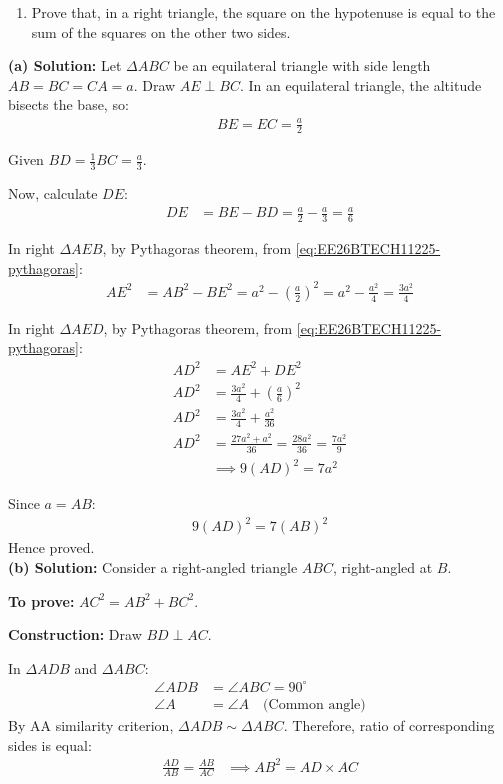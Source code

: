 \begin{enumerate}[label=\thesubsection.\arabic*, ref=\thesubsection.\theenumi]
\begin{enumerate}[label=(\alph*), leftmargin=1.5em, labelsep=0.5em]
        \item Prove that, in a right triangle, the square on the hypotenuse is equal to the sum of the squares on the other two sides.
    \end{enumerate}	\vspace{2pt}
    \noindent\textbf{(a) Solution:} Let $\Delta ABC$ be an equilateral triangle with side length $AB = BC = CA = a$.
Draw $AE \perp BC$. In an equilateral triangle, the altitude bisects the base, so:
\begin{align}
    BE = EC = \frac{a}{2}
\end{align}

Given $BD = \frac{1}{3}BC = \frac{a}{3}$.

Now, calculate $DE$:
\begin{align}
    DE &= BE - BD = \frac{a}{2} - \frac{a}{3} = \frac{a}{6}
\end{align}

In right $\Delta AEB$, by Pythagoras theorem, from \eqref{eq:EE26BTECH11225-pythagoras}:
\begin{align}
    AE^2 &= AB^2 - BE^2 = a^2 - \left(\frac{a}{2}\right)^2 = a^2 - \frac{a^2}{4} = \frac{3a^2}{4}
\end{align}

In right $\Delta AED$, by Pythagoras theorem, from \eqref{eq:EE26BTECH11225-pythagoras}:
\begin{align}
    AD^2 &= AE^2 + DE^2 \\
    AD^2 &= \frac{3a^2}{4} + \left(\frac{a}{6}\right)^2 \\
    AD^2 &= \frac{3a^2}{4} + \frac{a^2}{36} \\
    AD^2 &= \frac{27a^2 + a^2}{36} = \frac{28a^2}{36} = \frac{7a^2}{9} \\
    &\implies 9(AD)^2 = 7a^2
\end{align}

Since $a = AB$:
\begin{align}
    9(AD)^2 = 7(AB)^2
\end{align}
Hence proved. \\[8pt]
\noindent\textbf{(b) Solution:} Consider a right-angled triangle $ABC$, right-angled at $B$.

\textbf{To prove:} $AC^2 = AB^2 + BC^2$.

\textbf{Construction:} Draw $BD \perp AC$.

In $\Delta ADB$ and $\Delta ABC$:
\begin{align}
    \angle ADB &= \angle ABC = 90^\circ \\
    \angle A &= \angle A \quad \text{(Common angle)}
\end{align}
By AA similarity criterion, $\Delta ADB \sim \Delta ABC$.
Therefore, ratio of corresponding sides is equal:
\begin{align}
    \frac{AD}{AB} = \frac{AB}{AC} &\implies AB^2 = AD \times AC \label{eq:EE26BTECH11225-pyth-1}
\end{align}


\end{enumerate}
